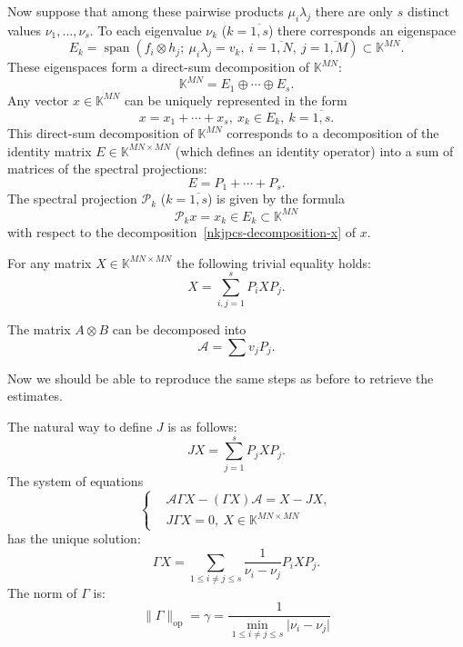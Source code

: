 \documentclass[a4paper]{jpconf}
\begin{document}
Now suppose that among these pairwise products \( \mu_i \lambda_j \)
    there are only \( s \) distinct values \( \nu_1, \ldots, \nu_s \).
To each eigenvalue \( \nu_k \) (\( k{=}\overline{1,s} \)) there corresponds
    an eigenspace \[ E_k = \operatorname{span}(f_i\otimes h_j;\ \mu_i\lambda_j = v_k,\ i{=}\overline{1,N},\ j{=}\overline{1,M}) \subset \mathbb{K}^{MN}. \]
These eigenspaces form a direct-sum decomposition of \( \mathbb{K}^{MN} \):
    \[ \mathbb{K}^{MN} = E_1 \oplus \cdots \oplus E_s. \]
Any vector \( x\in\mathbb{K}^{MN} \) can be uniquely represented
    in the form
    \begin{equation}\label{nkjpcs-decomposition-x}
        x = x_1 + \cdots + x_s,\ x_k\in E_k,\ k=\overline{1,s}.
    \end{equation}
This direct-sum decomposition of \( \mathbb{K}^{MN} \)
    corresponds to a decomposition of the identity matrix \( E\in \mathbb{K}^{MN{\times}MN} \)
    (which defines an identity operator)
    into a sum of matrices of the spectral projections:
    \[
        E = P_1 + \cdots + P_s.
    \]
The spectral projection \( \mathcal{P}_k \) (\(k{=}\overline{1,s}\)) is given by the formula
    \[
        \mathcal{P}_k x = x_k \in E_k\subset \mathbb{K}^{MN}
    \]
    with respect to the decomposition~\eqref{nkjpcs-decomposition-x} of \( x \).

For any matrix \( X\in \mathbb{K}^{MN{\times}MN} \)
    the following trivial equality holds:
    \[
        X = \sum_{i,j=1}^s P_i X P_j.
    \]

The matrix \( A\otimes B \) can be decomposed into
    \[
        \mathcal{A} = \sum v_j P_j.
    \]

Now we should be able to reproduce the same steps as before
    to retrieve the estimates.

The natural way to define \( J \) is as follows:
    \[
        JX = \sum_{j=1}^s P_j X P_j.
    \]
The system of equations
    \[\left\{\begin{aligned}
        & \mathcal{A}\Gamma X - (\Gamma X) \mathcal{A} = X - JX, \\
        & J\Gamma X = 0,\ X\in \mathbb{K}^{MN{\times}MN}
    \end{aligned}\right.\]
    has the unique solution:
    \[
        \Gamma X = \sum_{1\leq i{\neq}j \leq s} \frac{1}{\nu_i-\nu_j} P_i X P_j.
    \]
    The norm of \( \Gamma \) is:
    \[
        \|\Gamma\|_{\mathrm{op}} = \gamma = \frac{1}{\min_{1\leq i{\neq}j\leq s}\lvert\nu_i - \nu_j\rvert}
    \]
\end{document}
